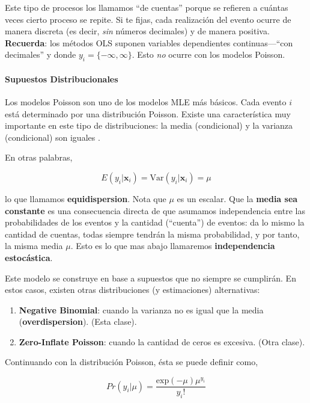 \documentclass[onesided]{article}\usepackage[]{graphicx}\usepackage[]{color}
\begin{document}
Este tipo de procesos los llamamos ``de cuentas'' porque se refieren a cu\'antas veces cierto proceso se repite. Si te fijas, cada realizaci\'on del evento ocurre de manera discreta (es decir, \emph{sin} n\'umeros decimales) y de manera positiva. {\bf Recuerda}: los m\'etodos OLS suponen variables dependientes continuas---``con decimales'' y donde $y_{i}=\{-\infty, \infty\}$. Esto \emph{no} ocurre con los modelos Poisson.


\paragraph{Supuestos Distribucionales} 

Los modelos Poisson son uno de los modelos MLE m\'as b\'asicos. Cada evento $i$ est\'a determinado por una distribuci\'on Poisson. Existe una caracter\'istica muy importante en este tipo de distribuciones: la media (condicional) y la varianza (condicional) son iguales \parencite[218]{Long:1997wv}. 

En otras palabras, 

\begin{equation}\label{poisson:var}
E(y_{i}|\boldsymbol{x}_{i})=\text{Var}(y_{i}|\boldsymbol{x}_{i})=\mu
\end{equation}

lo que llamamos {\bf equidispersion}. Nota que $\mu$ es un escalar. Que la {\bf media sea constante} es una consecuencia directa de que asumamos independencia entre las probabilidades de los eventos y la cantidad (``cuenta'') de eventos: da lo mismo la cantidad de cuentas, todas siempre tendr\'an la misma probabilidad, y por tanto, la misma media $\mu$. Esto es lo que mas abajo llamaremos {\bf independencia estoc\'astica}.

Este modelo se construye en base a supuestos que no siempre se cumplir\'an. En estos casos, existen otras distribuciones (y estimaciones) alternativas:

\begin{enumerate}
  \item {\bf Negative Binomial}: cuando la varianza no es igual que la media ({\bf overdispersion}). (Esta clase).
  \item {\bf Zero-Inflate Poisson}: cuando la cantidad de ceros es excesiva. (Otra clase).
\end{enumerate}

Continuando con la distribuci\'on Poisson, \'esta se puede definir como,

\begin{equation}\label{poisson:d}
Pr(y_{i}|\mu) = \frac{\text{exp}(-\mu)\mu^{y_{i}}}{y_{i}!}
\end{equation}
\end{document}
